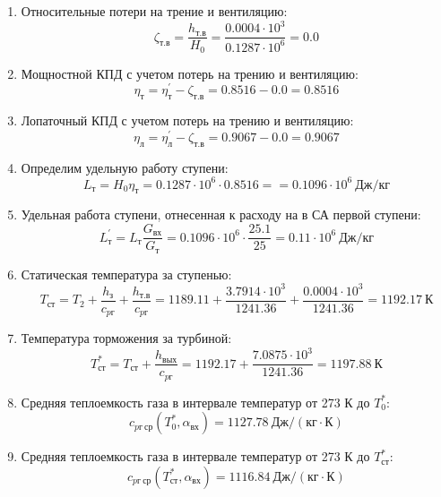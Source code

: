 \documentclass[a4paper,10pt]{article}
\begin{document}
\begin{enumerate}
        \item Относительные потери на трение и вентиляцию:
        \[
            \zeta_{т.в} = \frac{ h_{т.в} }{ H_0 } =
                \frac{ 0.0004 \cdot 10^3 }{ 0.1287 \cdot 10^6 } =
            0.0
        \]

        \item Мощностной КПД с учетом потерь на трению и вентиляцию:
        \[
            \eta_т = \eta_т^\prime - \zeta_{т.в} =
                0.8516 - 0.0 =
            0.8516
        \]

        \item Лопаточный КПД с учетом потерь на трению и вентиляцию:
        \[
            \eta_л = \eta_л^\prime - \zeta_{т.в} =
                0.9067 - 0.0 =
            0.9067
        \]

        \item Определим удельную работу ступени:
        \[
            L_т = H_0 \eta_т = 0.1287 \cdot 10^6 \cdot 0.8516 =
            = 0.1096 \cdot 10^6 \ Дж/кг
        \]

        \item Удельная работа ступени, отнесенная к расходу на в СА первой ступени:
        \[
            L_т^\prime = L_т \frac{ G_{вх} }{ G_т }  =
                0.1096 \cdot 10^6 \cdot
                \frac{ 25.1 }{ 25 } =
            0.11 \cdot 10^6 \ Дж/кг
        \]

        \item Статическая температура за ступенью:
        \[
            T_{ст} = T_2 + \frac{ h_з }{ c_{pг} } + \frac{ h_{т.в} }{ c_{pг} } =
                1189.11 +
                \frac{3.7914 \cdot 10^3 }{ 1241.36 } +
                \frac{ 0.0004 \cdot 10^3 }{ 1241.36 } =
            1192.17 \ К
        \]

        \item Температура торможения за турбиной:
        \[
            T_{ст}^* = T_{ст} + \frac{ h_{вых} }{ c_{pг} } =
                1192.17 +
                \frac{ 7.0875 \cdot 10^3 }{ 1241.36 } =
            1197.88 \ К
        \]

        \item Средняя теплоемкость газа в интервале температур от 273 К до $T_0^*$:
        \[
            c_{pг\ ср} (T_0^*, \alpha_{вх}) =
            1127.78 \ Дж/(кг \cdot К)
        \]

        \item Средняя теплоемкость газа в интервале температур от 273 К до $T_{ст}^*$:
        \[
            c_{pг\ ср} (T_{ст}^*, \alpha_{вх}) =
            1116.84 \ Дж/(кг \cdot К)
        \]


\end{enumerate}
\end{document}
